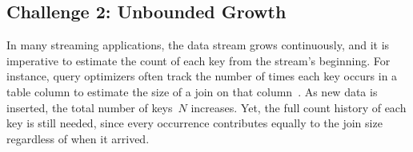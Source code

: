 \documentclass[sigconf]{acmart}
\begin{document}
\subsection{Challenge 2: Unbounded Growth}\label{sec:problem_analysis_unbounded_growth}
In many streaming applications, the data stream grows continuously, and it is imperative to estimate the count of each key from the stream's beginning.
For instance, query optimizers often track the number of times each key occurs in a table column to estimate the size of a join on that column~\cite{Compass,QueryOptimizationSketches,ConvolutionSketch}.
As new data is inserted, the total number of keys~$N$ increases.
Yet, the full count history of each key is still needed, since every occurrence contributes equally to the join size regardless of when it arrived.

\ifnotods
\end{document}
